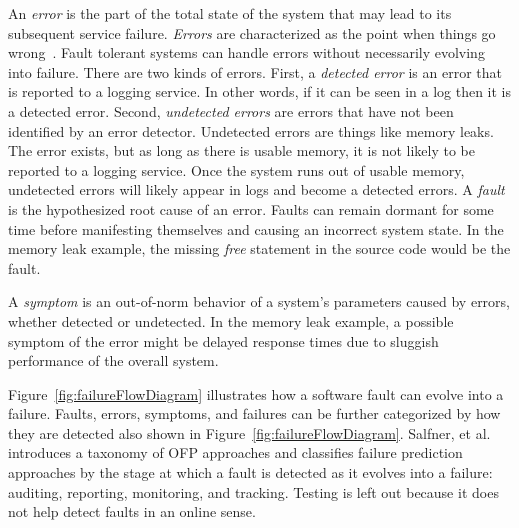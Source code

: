 An \emph{error} is the part of the total state of the system that may lead to
its subsequent service failure.  \emph{Errors} are characterized as the point
when things go wrong~\cite{salfnerSurvey}.  Fault tolerant systems can handle
errors without necessarily evolving into failure.  There are two kinds of
errors.  First, a \emph{detected error} is an error that is reported to a
logging service.  In other words, if it can be seen in a log then it is a
detected error.  Second, \emph{undetected errors} are errors that have not been
identified by an error detector.  Undetected errors are things like memory
leaks.  The error exists, but as long as there is usable memory, it is not
likely to be reported to a logging service.  Once the system runs out of usable
memory, undetected errors will likely appear in logs and become a detected
errors.  A \emph{fault} is the hypothesized root cause of an error.  Faults can
remain dormant for some time before manifesting themselves and causing an
incorrect system state.  In the memory leak example, the missing \emph{free}
statement in the source code would be the fault.  

A \emph{symptom} is an out-of-norm behavior of a system's parameters caused by
errors, whether detected or undetected.  In the memory leak example, a possible
symptom of the error might be delayed response times due to sluggish
performance of the overall system.

\figfailureFlowDiagram{\textwidth}

Figure~\ref{fig:failureFlowDiagram} illustrates how a software fault can evolve
into a failure.  Faults, errors, symptoms, and failures can be further
categorized by how they are detected also shown in
Figure~\ref{fig:failureFlowDiagram}.  Salfner, et al.~\cite{salfnerSurvey}
introduces a taxonomy of \ac{OFP} approaches and classifies failure prediction
approaches by the stage at which a fault is detected as it evolves into a
failure: auditing, reporting, monitoring, and tracking.  Testing is left out
because it does not help detect faults in an online sense.  


